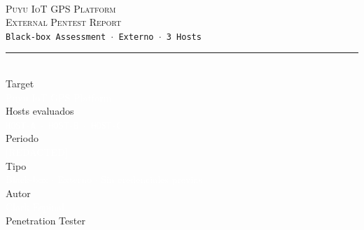 \documentclass[11pt,a4paper]{article}
\begin{document}
\raggedbottom
{}

\begin{titlepage}
\pagecolor{darkbg}
\color{white}


\vspace*{2cm}
\begin{center}

{\small{}}\\[1.2cm]

{\fontsize{28}{34}\selectfont\textsc{Puyu IoT GPS Platform}}\\[0.3cm]
{\fontsize{28}{34}\selectfont\textsc{\textcolor{accentblue}{External Pentest Report}}}\\[1.8cm]

{\small\textcolor{textlight}{\texttt{Black-box Assessment $\cdot$ Externo $\cdot$ 3 Hosts}}}\\[2.5cm]

{\color{accentblue!40}\rule{6cm}{0.4pt}}\\[2cm]

{\small\textcolor{textmuted}{Target}}\\[0.2cm]
{\normalsize\textcolor{white}{Puyu IoT GPS Platform}}\\[0.5cm]
{\small\textcolor{textmuted}{Hosts evaluados}}\\[0.2cm]
{\normalsize\textcolor{white}{\texttt{HOST-A $\cdot$ HOST-B $\cdot$ HOST-C}}}\\[0.5cm]
{\small\textcolor{textmuted}{Periodo}}\\[0.2cm]
{\normalsize\textcolor{white}{[REDACTED]}}\\[0.5cm]
{\small\textcolor{textmuted}{Tipo}}\\[0.2cm]
{\normalsize\textcolor{white}{Black-box $\cdot$ Externo $\cdot$ Sin credenciales previas}}\\[2cm]

{\small\textcolor{textmuted}{Autor}}\\[0.3cm]
{\normalsize\textcolor{white}{Clark Espinal}}\\[0.1cm]
{\small\textcolor{textlight}{Penetration Tester}}

\end{center}
\end{titlepage}
\end{document}
